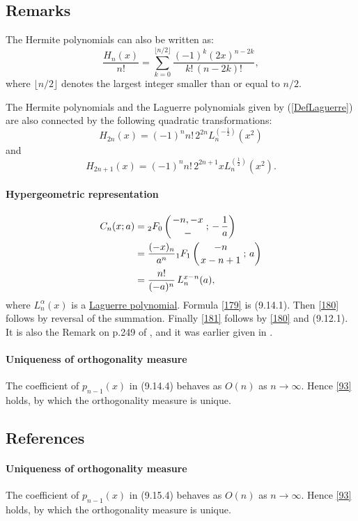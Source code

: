 \documentclass[envcountchap,graybox]{svmono}
\newcommand{\hyp}[5]{\mbox{}_{#1}{F}_{#2}
\left(\genfrac{}{}{0pt}{}{#3}{#4}\,;\,#5\right)}
\newcommand\al\alpha
\newcommand\iy\infty
\begin{document}
\subsection*{Remarks}
The Hermite polynomials can also be written as:
$$\frac{H_n(x)}{n!}=\sum_{k=0}^{\lfloor n/2\rfloor}
\frac{(-1)^k(2x)^{n-2k}}{k!\,(n-2k)!},$$
where $\lfloor n/2\rfloor$ denotes the largest integer smaller than or equal to $n/2$.

\noindent
The Hermite polynomials and the Laguerre polynomials given by (\ref{DefLaguerre}) are also
connected by the following quadratic transformations:
$$H_{2n}(x)=(-1)^nn!\,2^{2n}L_n^{(-\frac{1}{2})}(x^2)$$
and
$$H_{2n+1}(x)=(-1)^nn!\,2^{2n+1}xL_n^{(\frac{1}{2})}(x^2).$$
\label{sec9.14}
%
\paragraph{Hypergeometric representation}
\begin{align}
C_n(x;a)&=\hyp20{-n,-x}-{-\,\frac1a}
\label{179}\\
&=\frac{(-x)_n}{a^n} \hyp11{-n}{x-n+1}a
\label{180}\\
&=\frac{n!}{(-a)^n}\,L_n^{x-n}(a),
\label{181}
\end{align}
where $L_n^\al(x)$ is a
\hyperref[sec9.12]{Laguerre polynomial}.
Formula \eqref{179} is (9.14.1). Then \eqref{180} follows by reversal
of the summation. Finally \eqref{181} follows by \eqref{180} and
(9.12.1). It is also the Remark on p.249 of , and it
was earlier given in .
%
\paragraph{Uniqueness of orthogonality measure}
The coefficient of $p_{n-1}(x)$ in (9.14.4) behaves as $O(n)$ as $n\to\iy$.
Hence \eqref{93} holds, by which the orthogonality measure is unique.
%

\subsection*{References}
\label{sec9.15}
%
\paragraph{Uniqueness of orthogonality measure}
The coefficient of $p_{n-1}(x)$ in (9.15.4) behaves as $O(n)$ as $n\to\iy$.
Hence \eqref{93} holds, by which the orthogonality measure is unique.
%
\end{document}
